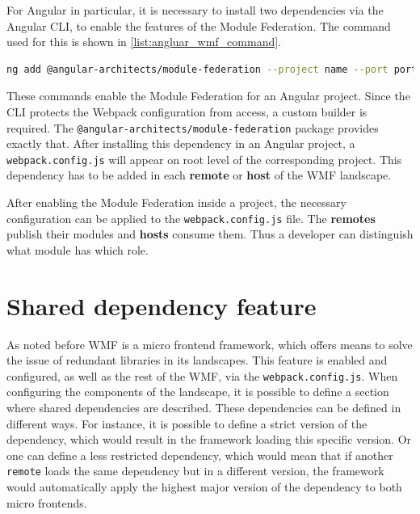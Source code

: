 For Angular in particular, it is necessary to install two dependencies via the Angular CLI, to enable the features of the Module Federation. The command used for this is shown in \ref{list:angluar_wmf_command}. 

\begin{lstlisting}[language=Bash, caption=Angular CLI console command to enable Module Federation in an Angular project, label=list:angluar_wmf_command,  xleftmargin=.0\textwidth, xrightmargin=.0\textwidth]
	ng add @angular-architects/module-federation --project name --port port
\end{lstlisting}

These commands enable the Module Federation for an Angular project. Since the CLI protects the Webpack configuration from access, a custom builder is required. The \texttt{@angular-architects/module-federation} package provides exactly that.
After installing this dependency in an Angular project, a \texttt{webpack.config.js} will appear on root level of the corresponding project.\cite{wmf_angular_dependency_install}
This dependency has to be added in each \textbf{remote} or \textbf{host} of the WMF landscape. 

After enabling the Module Federation inside a project, the necessary configuration can be applied to the \texttt{webpack.config.js} file. The \textbf{remotes} publish their modules and \textbf{hosts} consume them. Thus a developer can distinguish what module has which role.

\section{Shared dependency feature}

As noted before WMF is a micro frontend framework, which offers means to solve the issue of redundant libraries in its landscapes.
This feature is enabled and configured, as well as the rest of the WMF, via the \texttt{webpack.config.js}. When configuring the components of the landscape, it is possible to define a section where shared dependencies are described. These dependencies can be defined in different ways. For instance, it is possible to define a strict version of the dependency, which would result in the framework loading this specific version. Or one can define a less restricted dependency, which would mean that if another \texttt{remote} loads the same dependency but in a different version, the framework would automatically apply the highest major version of the dependency to both micro frontends.

